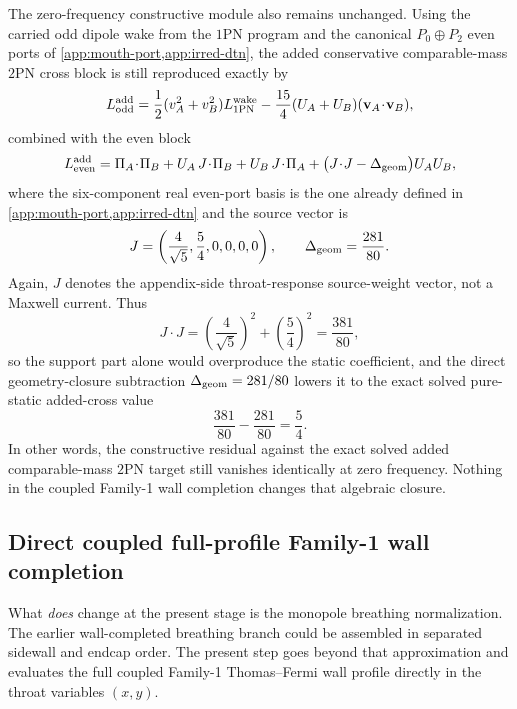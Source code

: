 \documentclass[11pt]{article}
\newcommand{\OnePN}{\mathrm{1PN}}
\newcommand{\TwoPN}{\mathrm{2PN}}
\begin{document}
The zero-frequency constructive module also remains unchanged.
Using the carried odd dipole wake from the \(\OnePN\) program and the canonical
\(P_0\oplus P_2\) even ports of \cref{app:mouth-port,app:irred-dtn}, the added
conservative comparable-mass \(\TwoPN\) cross block is still reproduced exactly by
\begin{equation}
L^{\rm add}_{\rm odd}
=
\frac12(v_A^2+v_B^2)L^{\rm wake}_{1\mathrm{PN}}
-\frac{15}{4}(U_A+U_B)(\mathbf v_A\!\cdot\!\mathbf v_B),
\label{eq:family1-final-Lodd}
\end{equation}
combined with the even block
\begin{equation}
L^{\rm add}_{\rm even}
=
\Pi_A\!\cdot\!\Pi_B
+U_A\,J\!\cdot\!\Pi_B
+U_B\,J\!\cdot\!\Pi_A
+\bigl(J\!\cdot\!J-\Delta_{\rm geom}\bigr)U_AU_B,
\label{eq:family1-final-Leven}
\end{equation}
where the six-component real even-port basis is the one already defined in
\cref{app:mouth-port,app:irred-dtn} and the source vector is
\begin{equation}
J=\left(\frac{4}{\sqrt5},\frac54,0,0,0,0\right),
\qquad
\Delta_{\rm geom}=\frac{281}{80}.
\label{eq:family1-final-J-deltageom}
\end{equation}
Again, \(J\) denotes the appendix-side throat-response source-weight vector, not a
Maxwell current.
Thus
\begin{equation}
J\!\cdot\!J
=\left(\frac{4}{\sqrt5}\right)^2+\left(\frac54\right)^2
=\frac{381}{80},
\label{eq:family1-final-JdotJ}
\end{equation}
so the support part alone would overproduce the static coefficient, and the direct
geometry-closure subtraction \(\Delta_{\rm geom}=281/80\) lowers it to the exact solved
pure-static added-cross value
\begin{equation}
\frac{381}{80}-\frac{281}{80}=\frac54.
\label{eq:family1-final-static-cross}
\end{equation}
In other words, the constructive residual against the exact solved added comparable-mass
\(\TwoPN\) target still vanishes identically at zero frequency.
Nothing in the coupled Family-1 wall completion changes that algebraic closure.

\subsection{Direct coupled full-profile Family-1 wall completion}
\label{app:family1-final-coupled-wall}

What \emph{does} change at the present stage is the monopole breathing normalization.
The earlier wall-completed breathing branch could be assembled in separated sidewall and
endcap order.
The present step goes beyond that approximation and evaluates the full coupled Family-1
Thomas--Fermi wall profile directly in the throat variables \((x,y)\).
\end{document}
